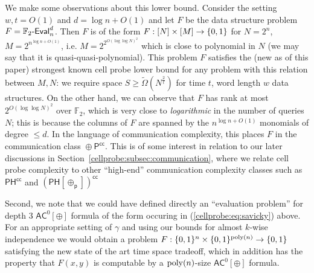 We make some observations about this lower bound. Consider the setting $w,t=O(1)$ and $d = \log n + O(1)$ and let $F$ be the data structure problem $F = \mathbb{F}_2\text{-}\mathsf{Eval}_n^d$.  Then $F$ is of the form $F: [N] \times [M] \to \{0,1\}$ for $N = 2^n$, $M = 2^{n^{\log n + O(1)}}$, i.e. $M = 2^{2^{O(\log\log N)^2}}$ which is close to polynomial in $N$ (we may say that it is quasi-quasi-polynomial). 
This problem $F$ satisfies the (new as of this paper) strongest known cell probe lower bound for any problem with this relation between $M,N$: we require space $S \geq \tilde{\Omega}(N^{\frac{2}{t}})$ for time $t$, word length $w$ data structures.
On the other hand, we can observe that $F$ has rank at most $2^{O(\log \log N)^2}$ over $\mathbb{F}_2$, which is very close to \emph{logarithmic} in the number of queries $N$; this is because the columns of $F$ are spanned by the $n^{\log n + O(1)}$ monomials of degree $\leq d$. In the language of communication complexity, this places $F$ in the communication class $\mathop{\oplus}\mathsf{P^{cc}}$. This is of some interest in relation to our later discussions in Section~\ref{cellprobe:subsec:communication}, where we relate cell probe complexity to other ``high-end'' communication complexity classes such as $\mathsf{PH^{cc}}$ and $\mathsf{(PH[\oplus_p])^{cc}}$

Second, we note that we could have defined directly an ``evaluation problem'' for depth 3 $\mathsf{AC}^0[\oplus]$ formula of the form occuring in (\ref{cellprobe:eq:savicky}) above. For an appropriate setting of $\gamma$ and using our bounds for almost $k$-wise independence we would obtain a problem $F: \{0,1\}^n \times \{0,1\}^{\mathrm{poly}(n)} \to \{0,1\}$ satisfying the new state of the art time space tradeoff, which in addition has the property that $F(x,y)$ is computable by a $\mathrm{poly}(n)$-size $\mathsf{AC}^0[\oplus]$ formula.


